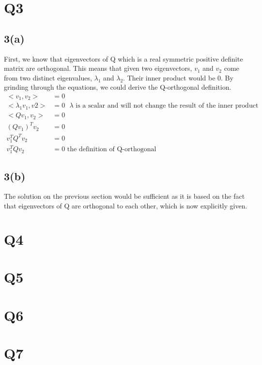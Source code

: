 \documentclass{article}
\begin{document}
\section{Q3}
\subsection*{3(a)}
First, we know that eigenvectors of Q which is a real symmetric positive definite matrix are orthogonal. This means that given two eigenvectors, $v_1$ and $v_2$ come from two distinct eigenvalues, $\lambda_1$ and $\lambda_2$. Their inner product would be 0. By grinding through the equations, we could derive the Q-orthogonal definition.
\begin{equation*}
\begin{aligned}
<v_1, v_2> &= 0\\
<\lambda_1 v_1, v2> &= 0  \mbox{  $\lambda$ is a scalar and will not change the result of the inner product}\\
<Q v_1, v_2> &= 0 \\
(Q v_1)^Tv_2 &= 0 \\
v_1^T Q^Tv_2 &= 0\\
v_1^T Q v_2 &= 0 \mbox{   the definition of Q-orthogonal}
\end{aligned}
\end{equation*}
\subsection*{3(b)}
The solution on the previous section would be sufficient as it is based on the fact that eigenvectors of Q are orthogonal to each other, which is now explicitly given.
\section{Q4}
\section{Q5}
\section{Q6}

\section{Q7}

\end{document}
